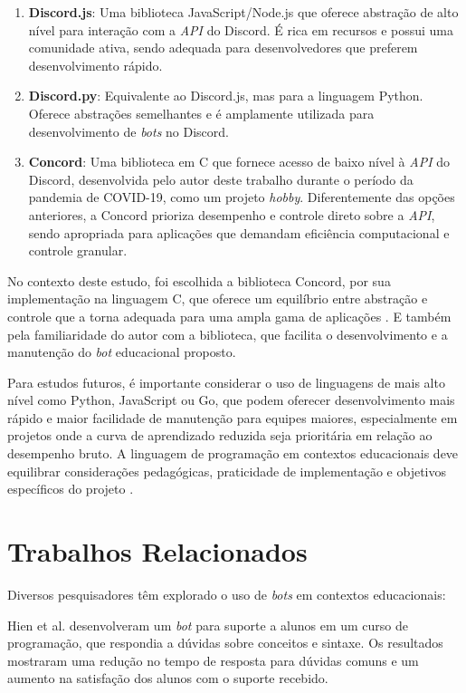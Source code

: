 \begin{enumerate}
\item \textbf{Discord.js}\cite{discordjs}: Uma biblioteca JavaScript/Node.js que
oferece abstração de alto nível para interação com a \textit{API} do Discord. É
rica em recursos e possui uma comunidade ativa, sendo adequada para
desenvolvedores que preferem desenvolvimento rápido.
\item \textbf{Discord.py}\cite{discordpy}: Equivalente ao Discord.js, mas para a
linguagem Python. Oferece abstrações semelhantes e é amplamente utilizada para
desenvolvimento de \textit{bots} no Discord.
\item \textbf{Concord}\cite{muller}: Uma biblioteca em C que fornece acesso de
baixo nível à \textit{API} do Discord, desenvolvida pelo autor deste trabalho
durante o período da pandemia de COVID-19, como um projeto \textit{hobby}.
Diferentemente das opções anteriores, a Concord prioriza desempenho e controle
direto sobre a \textit{API}, sendo apropriada para aplicações que demandam
eficiência computacional e controle granular.
\end{enumerate}

No contexto deste estudo, foi escolhida a biblioteca Concord, por sua
implementação na linguagem C, que oferece um equilíbrio entre abstração e
controle que a torna adequada para uma ampla gama de aplicações
\cite{kernighan1988}. E também pela familiaridade do autor com a biblioteca, que
facilita o desenvolvimento e a manutenção do \textit{bot} educacional proposto.

Para estudos futuros, é importante considerar o uso de linguagens de mais alto
nível como Python, JavaScript ou Go, que podem oferecer desenvolvimento mais
rápido e maior facilidade de manutenção para equipes maiores, especialmente em
projetos onde a curva de aprendizado reduzida seja prioritária em relação ao
desempenho bruto. A linguagem de programação em contextos educacionais deve
equilibrar considerações pedagógicas, praticidade de implementação e objetivos
específicos do projeto
\cite{pears2007}.

\section{Trabalhos Relacionados} \label{sec:trab-rel}

Diversos pesquisadores têm explorado o uso de \textit{bots} em contextos
educacionais:

Hien et al. \cite{hien2018} desenvolveram um \textit{bot} para suporte a alunos
em um curso de programação, que respondia a dúvidas sobre conceitos e sintaxe.
Os resultados mostraram uma redução no tempo de resposta para dúvidas comuns e
um aumento na satisfação dos alunos com o suporte recebido.

